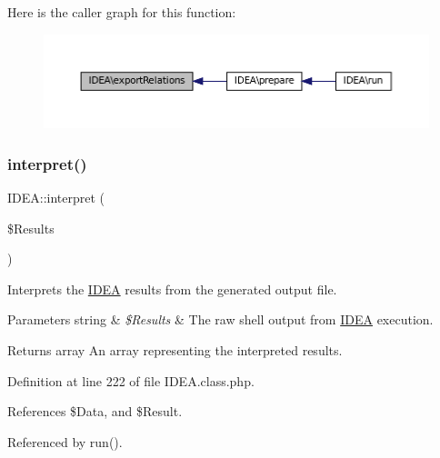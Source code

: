 Here is the caller graph for this function\+:\nopagebreak
\begin{figure}[H]
\begin{center}
\leavevmode
\includegraphics[width=350pt]{class_i_d_e_a_a4bb32a8d3fd43d598db825f0e8dd556d_icgraph}
\end{center}
\end{figure}
\mbox{\label{class_i_d_e_a_a56633ba474df66fc6073aa4757097145}} 
\subsubsection{\texorpdfstring{interpret()}{interpret()}}
{\footnotesize\ttfamily I\+D\+E\+A\+::interpret (\begin{DoxyParamCaption}\item[{}]{\$\+Results }\end{DoxyParamCaption})\hspace{0.3cm}{\ttfamily [protected]}}

Interprets the \hyperlink{class_i_d_e_a}{I\+D\+EA} results from the generated output file.


\begin{DoxyParams}[1]{Parameters}
string & {\em \$\+Results} & The raw shell output from \hyperlink{class_i_d_e_a}{I\+D\+EA} execution. \\
\hline
\end{DoxyParams}
\begin{DoxyReturn}{Returns}
array An array representing the interpreted results. 
\end{DoxyReturn}


Definition at line 222 of file I\+D\+E\+A.\+class.\+php.



References \$\+Data, and \$\+Result.



Referenced by run().

